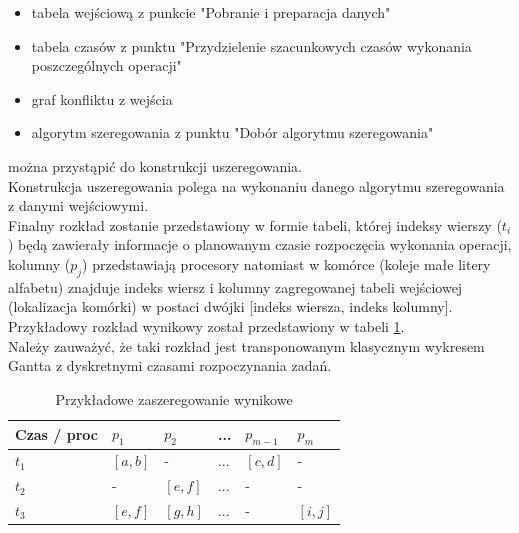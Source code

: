 \documentclass[brudnopis]{xmgr}
\begin{document}
\begin{itemize}
    \item tabela wejściową z punkcie "Pobranie i preparacja danych"
    \item tabela czasów z punktu "Przydzielenie szacunkowych czasów wykonania poszczególnych operacji"
    \item graf konfliktu z wejścia
    \item algorytm szeregowania z punktu "Dobór algorytmu szeregowania"
\end{itemize}

można przystąpić do konstrukcji uszeregowania.
\medskip\\

Konstrukcja uszeregowania polega na wykonaniu danego algorytmu szeregowania z danymi wejściowymi.
\medskip\\

Finalny rozkład zostanie przedstawiony w formie tabeli, której indeksy wierszy ($t_i$) będą zawierały informacje o planowanym czasie rozpoczęcia wykonania operacji, kolumny ($p_j$) przedstawiają procesory natomiast w komórce (koleje małe litery alfabetu) znajduje indeks wiersz i kolumny zagregowanej tabeli wejściowej (lokalizacja komórki) w postaci dwójki [indeks wiersza, indeks kolumny].
\medskip\\

Przykładowy rozkład wynikowy został przedstawiony w tabeli \ref{tab:example-sched-out}.
\medskip\\

Należy zauważyć, że taki rozkład jest transponowanym klasycznym wykresem Gantta z dyskretnymi czasami rozpoczynania zadań.

\begin{table}[!tbh]
\begin{tabular}{|l|l|l|l|l|l|} \hline
Czas / proc & $p_1$     & $p_2$     & ...   & $p_{m-1}$ & $p_{m}$ \\ \hline
$t_1$       & $[a,b]$   & -         & ...   & $[c,d]$   & - \\ \hline
$t_2$       & -         & $[e,f]$   & ...   & -         & - \\ \hline
$t_3$       & $[e,f]$   & $[g,h]$   & ...   & -         & $[i,j]$\\ \hline
\end{tabular}
\caption{Przykładowe zaszeregowanie wynikowe\label{tab:example-sched-out}}
\end{table}
\end{document}

